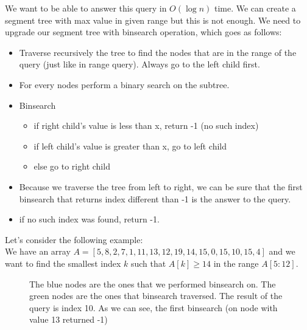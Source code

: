 \documentclass{article}
\begin{document}
We want to be able to answer this query in \(O(\log{n})\) time. We can create 
a segment tree with max value in given range but this is not enough. We need to upgrade our segment tree
with binsearch operation, which goes as follows:
\begin{itemize}
    \item Traverse recursively the tree to find the nodes that are in the range of the query (just like in range query). Always go to the left child first.
    \item For every nodes perform a binary search on the subtree.
    \item Binsearch 
        \begin{itemize}
            \item if right child's value is less than x, return -1 (no such index)
            \item if left child's value is greater than x, go to left child
            \item else go to right child
        \end{itemize}
    \item Because we traverse the tree from left to right, we can be sure that the first binsearch that returns index different than -1 is the answer to the query.
    \item if no such index was found, return -1.
\end{itemize}


\FloatBarrier
Let's consider the following example: \\
We have an array \(A = [5, 8, 2, 7, 1, 11, 13, 12, 19, 14, 15, 0, 15, 10, 15, 4]\) and we want to find the smallest index \(k\) such that \(A[k] \geq 14\) in the range \(A[5:12]\).

\begin{figure}[H]
    \centering
    
    \caption{The blue nodes are the ones that we performed binsearch on. The green nodes are the ones that binsearch traversed. The result of the query is index 10. As we can see, the first binsearch (on node with value 13 returned -1)}
    \label{fig:segment_tree_1}
\end{figure}
\end{document}
